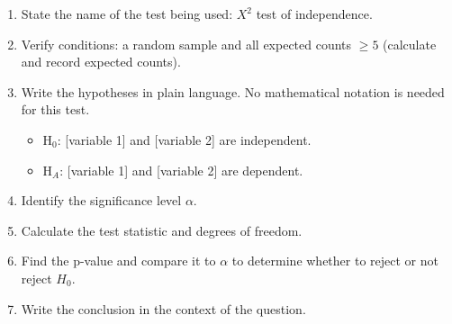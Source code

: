 \begin{termBox}{
\begin{enumerate}
\setlength{\itemsep}{0mm}
\item State the name of the test being used: $X^2$ test of independence.
\item Verify conditions: a random sample and all expected counts $\ge 5$ (calculate and record expected counts).
\item Write the hypotheses in plain language. No mathematical notation is needed for this test.\vspace{-2mm}
\begin{itemize}
\item H$_0$: [variable 1] and [variable 2] are independent.
\item H$_A$: [variable 1] and [variable 2] are dependent.
\end{itemize}
\item Identify the significance level $\alpha$.
\item Calculate the test statistic and degrees of freedom.%
\item Find the p-value and compare it to $\alpha$ to determine whether to reject or not reject $H_0$.
\item Write the conclusion in the context of the question.
\end{enumerate}}
\end{termBox}



